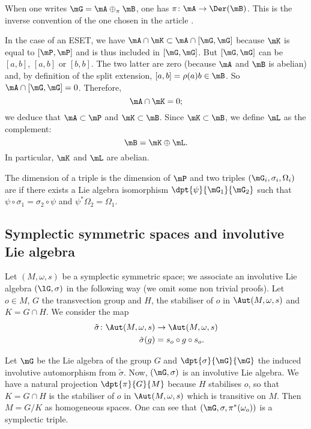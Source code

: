 \begin{remark}
	When one writes $\mG=\mA\oplus_{\pi}\mB$, one has $\pi\colon \mA\to \Der(\mB)$. This is the inverse convention of the one chosen in the article \cite{StrictSolvableSym}.
\end{remark}

In the case of an ESET, we have $\mA\cap\mK\subset\mA\cap[\mG,\mG]$ because $\mK$ is equal to $[\mP,\mP]$ and is thus included in $[\mG,\mG]$. But $[\mG,\mG]$ can be $[a,b]$, $[a,b]$ or $[b,b]$. The two latter are zero (because $\mA$ and $\mB$ is abelian) and, by definition of the split extension, $[a,b]=\rho(a)b\in\mB$. So $\mA\cap[\mG,\mG]=0$. Therefore,
\[
	\mA\cap\mK=0;
\]
we deduce that $\mA\subset\mP$ and $\mK\subset \mB$. Since $\mK\subset\mB$, we define $\mL$ as the complement:
\[
	\mB=\mK\oplus\mL.
\]
In particular, $\mK$ and $\mL$ are abelian.

The dimension of a triple is the dimension of $\mP$ and two triples $(\mG_i,\sigma_i,\Omega_i)$ are  if there exists a Lie algebra isomorphism $\dpt{\psi}{\mG_1}{\mG_2}$ such that $\psi\circ\sigma_1=\sigma_2\circ \psi$ and $\psi^*\Omega_2=\Omega_1$.

\subsection{Symplectic symmetric spaces and involutive Lie algebra}

Let $(M,\omega,s)$ be a symplectic symmetric space; we associate an involutive Lie algebra $(\lG,\sigma)$ in the following way (we omit some non trivial proofs). Let $o\in M$, $G$ the transvection group and $H$, the stabiliser of $o$ in $\Aut(M,\omega,s)$ and $K=G\cap H$. We consider the map
\begin{equation}
	\begin{aligned}
		\tilde\sigma\colon \Aut(M,\omega,s) & \to \Aut(M,\omega,s)  \\
		\tilde\sigma(g)                     & =s_o\circ g\circ s_o.
	\end{aligned}
\end{equation}

Let $\mG$ be the Lie algebra of the group $G$ and $\dpt{\sigma}{\mG}{\mG}$ the induced involutive automorphism from $\tilde\sigma$. Now, $(\mG,\sigma)$ is an involutive Lie algebra. We have a natural projection $\dpt{\pi}{G}{M}$ because $H$ stabilises $o$, so that $K=G\cap H$ is the stabiliser of $o$ in $\Aut(M,\omega,s)$ which is transitive on $M$. Then $M=G/K$ as homogeneous spaces. One can see that $(\mG,\sigma,\pi^*(\omega_o))$ is a symplectic triple.

